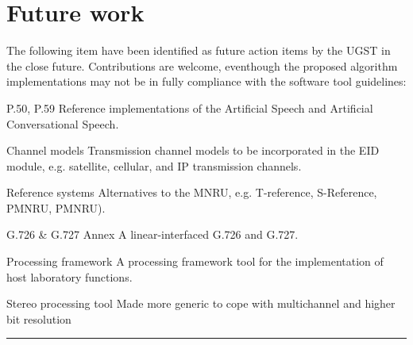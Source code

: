 \chapter{Future work}

The following item have been identified as future action items by the
UGST in the close future. Contributions are welcome, eventhough the
proposed algorithm implementations may not be in fully compliance with
the software tool guidelines:

\begin{Descr}{60mm}
\item[P.50, P.59]
        Reference implementations of the Artificial Speech and
        Artificial Conversational Speech. \\
\item[Channel models]
        Transmission channel models to be incorporated in the EID
        module, e.g. satellite, cellular, and IP transmission
        channels. \\
\item[Reference systems]
        Alternatives to the MNRU, e.g. T-reference, S-Reference,
        PMNRU, PMNRU). \\
\item[G.726 \& G.727 Annex A]
        linear-interfaced G.726 and G.727. \\
\item[Processing framework]
        A processing framework tool for the implementation of host
        laboratory functions. \\
\item[Stereo processing tool]
        Made more generic to cope with multichannel and higher bit resolution \\
\end{Descr}

\begin{center}
  \rule{7cm}{2pt}
\end{center}
